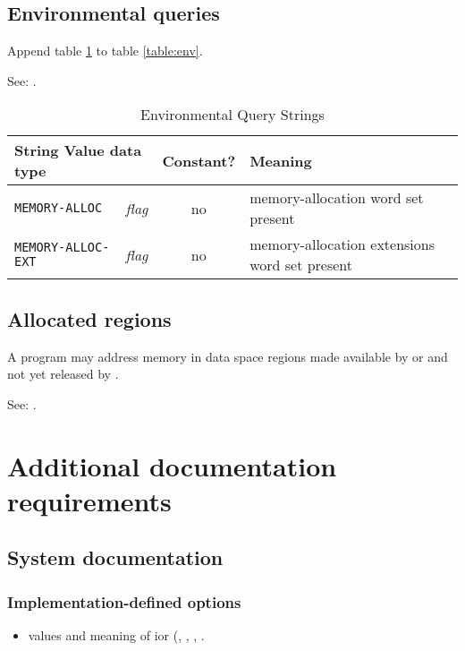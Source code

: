 \subsection{Environmental queries} %

Append table \ref{mem:env} to table \ref{table:env}.

See: .

\begin{table}[ht]
  \begin{center}
	\caption{Environmental Query Strings}
	\label{mem:env}
	\begin{tabular}{p{9em}rcp{}}
		\hline\hline
		\multicolumn{2}{l}{String \hfill Value data type} & Constant? & Meaning \\
		\hline
		\texttt{MEMORY-ALLOC}		& \emph{flag}		& no	&
			memory-allocation word set present \\
		\texttt{MEMORY-ALLOC-EXT}	& \emph{flag}		& no	&
			memory-allocation extensions word set present \\
		\hline\hline
	\end{tabular}
  \end{center}
\end{table}

\subsection{Allocated regions} %

A program may address memory in data space regions made available
by  or  and not yet released by .

See: .


\section{Additional documentation requirements} %

\subsection{System documentation} %

\subsubsection{Implementation-defined options} %
\begin{itemize}
\item values and meaning of ior
	(,
	 ,
	 ,
	 .
\end{itemize}

